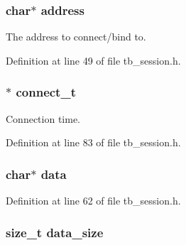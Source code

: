 \hypertarget{structtb__session__t_a879a8cdf605d02f8af8b2e216b8764f2}{
\subsubsection[{address}]{\setlength{\rightskip}{0pt plus 5cm}char$\ast$ address}}\label{structtb__session__t_a879a8cdf605d02f8af8b2e216b8764f2}


The address to connect/bind to. 



Definition at line 49 of file tb\-\_\-session.\-h.

\hypertarget{structtb__session__t_a49678949e63fd3a8335bac2bfa9d9ff2}{
\subsubsection[{connect\-\_\-t}]{$\ast$ connect\-\_\-t}}\label{structtb__session__t_a49678949e63fd3a8335bac2bfa9d9ff2}


Connection time. 



Definition at line 83 of file tb\-\_\-session.\-h.

\hypertarget{structtb__session__t_a91a70b77df95bd8b0830b49a094c2acb}{
\subsubsection[{data}]{\setlength{\rightskip}{0pt plus 5cm}char$\ast$ data}}\label{structtb__session__t_a91a70b77df95bd8b0830b49a094c2acb}


Definition at line 62 of file tb\-\_\-session.\-h.

\hypertarget{structtb__session__t_ad6bc120bffc64dfc5230863a8ba96596}{
\subsubsection[{data\-\_\-size}]{\setlength{\rightskip}{0pt plus 5cm}size\-\_\-t data\-\_\-size}}\label{structtb__session__t_ad6bc120bffc64dfc5230863a8ba96596}


